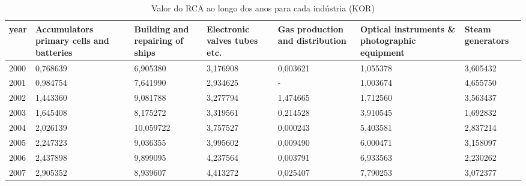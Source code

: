 \begin{table}
\centering
\caption{Valor do RCA ao longo dos anos para cada indústria (KOR)}
\begin{tabular}{p{1cm}p{2cm}p{2cm}p{2cm}p{2cm}p{2cm}p{2cm}}
\toprule
 year &  Accumulators primary cells and batteries &  Building and repairing of ships &  Electronic valves tubes etc. &  Gas production and distribution &  Optical instruments \& photographic equipment &  Steam generators \\
\midrule
 2000 &                                  0,768639 &                         6,905380 &                      3,176908 &                         0,003621 &                                      1,055378 &          3,605432 \\
 2001 &                                  0,984754 &                         7,641990 &                      2,934625 &                                - &                                      1,003674 &          4,655750 \\
 2002 &                                  1,443360 &                         9,081788 &                      3,277794 &                         1,474665 &                                      1,712560 &          3,563437 \\
 2003 &                                  1,645408 &                         8,175272 &                      3,319561 &                         0,214528 &                                      3,910545 &          1,692832 \\
 2004 &                                  2,026139 &                        10,059722 &                      3,757527 &                         0,000243 &                                      5,403581 &          2,837214 \\
 2005 &                                  2,247323 &                         9,036355 &                      3,995602 &                         0,009490 &                                      6,000471 &          3,158097 \\
 2006 &                                  2,437898 &                         9,899095 &                      4,237564 &                         0,003791 &                                      6,933563 &          2,230262 \\
 2007 &                                  2,905352 &                         8,939607 &                      4,413272 &                         0,025407 &                                      7,790253 &          3,072377 \\

\end{tabular}
\end{table}
